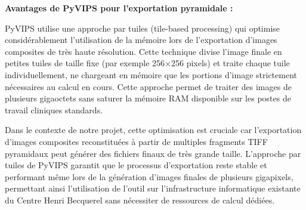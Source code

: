 \textbf{Avantages de PyVIPS pour l'exportation pyramidale :}

PyVIPS utilise une approche par tuiles (tile-based processing) qui optimise considérablement l'utilisation de la mémoire lors de l'exportation d'images composites de très haute résolution. Cette technique divise l'image finale en petites tuiles de taille fixe (par exemple 256×256 pixels) et traite chaque tuile individuellement, ne chargeant en mémoire que les portions d'image strictement nécessaires au calcul en cours. Cette approche permet de traiter des images de plusieurs gigaoctets sans saturer la mémoire RAM disponible sur les postes de travail cliniques standards.

Dans le contexte de notre projet, cette optimisation est cruciale car l'exportation d'images composites reconstituées à partir de multiples fragments TIFF pyramidaux peut générer des fichiers finaux de très grande taille. L'approche par tuiles de PyVIPS garantit que le processus d'exportation reste stable et performant même lors de la génération d'images finales de plusieurs gigapixels, permettant ainsi l'utilisation de l'outil sur l'infrastructure informatique existante du Centre Henri Becquerel sans nécessiter de ressources de calcul dédiées.